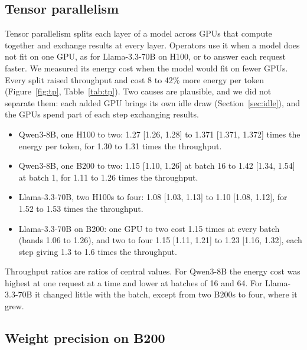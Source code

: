 \documentclass[11pt]{article}
\begin{document}
\subsection{Tensor parallelism}\label{sec:tp}

Tensor parallelism splits each layer of a model across GPUs that compute together and exchange results at every layer. Operators use it when a model does not fit on one GPU, as for Llama-3.3-70B on H100, or to answer each request faster. We measured its energy cost when the model would fit on fewer GPUs. Every split raised throughput and cost 8 to 42\% more energy per token (Figure~\ref{fig:tp}, Table~\ref{tab:tp}). Two causes are plausible, and we did not separate them: each added GPU brings its own idle draw (Section~\ref{sec:idle}), and the GPUs spend part of each step exchanging results.
\begin{itemize}
\item Qwen3-8B, one H100 to two: 1.27 [1.26, 1.28] to 1.371 [1.371, 1.372] times the energy per token, for 1.30 to 1.31 times the throughput.
\item Qwen3-8B, one B200 to two: 1.15 [1.10, 1.26] at batch 16 to 1.42 [1.34, 1.54] at batch 1, for 1.11 to 1.26 times the throughput.
\item Llama-3.3-70B, two H100s to four: 1.08 [1.03, 1.13] to 1.10 [1.08, 1.12], for 1.52 to 1.53 times the throughput.
\item Llama-3.3-70B on B200: one GPU to two cost 1.15 times at every batch (bands 1.06 to 1.26), and two to four 1.15 [1.11, 1.21] to 1.23 [1.16, 1.32], each step giving 1.3 to 1.6 times the throughput.
\end{itemize}
Throughput ratios are ratios of central values. For Qwen3-8B the energy cost was highest at one request at a time and lower at batches of 16 and 64. For Llama-3.3-70B it changed little with the batch, except from two B200s to four, where it grew.

\subsection{Weight precision on B200}\label{sec:precision}
\end{document}
